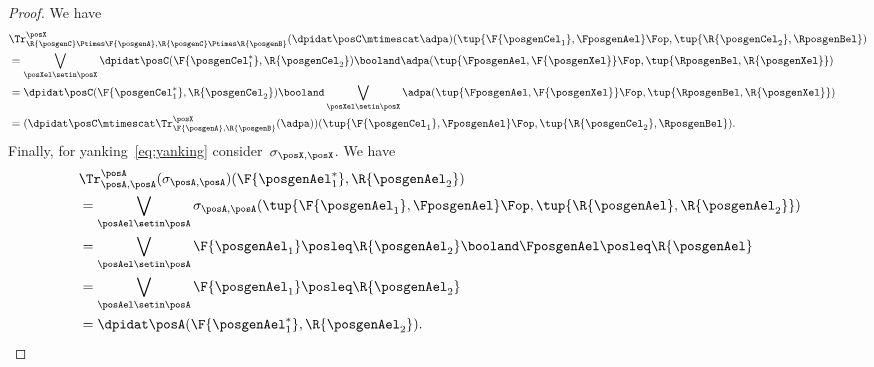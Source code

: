 \begin{proof}
    We have
    \begin{equation}
        \begin{aligned}
            {}
             & \Tr_{\R{\posgenC}\Ptimes \F{\posgenA},\R{\posgenC}\Ptimes \R{\posgenB}}^{\posX}(\dpidat\posC\mtimescat \adpa)(\tup{\F{\posgenCel_1},\FposgenAel}\Fop, \tup{\R{\posgenCel_2},\RposgenBel}) \\
             & = \bigvee_{\posXel \setin \posX} \dpidat\posC(\F{\posgenCel_1^*},\R{\posgenCel_2})\booland \adpa(\tup{\FposgenAel,\F{\posgenXel}}\Fop, \tup{\RposgenBel,\R{\posgenXel}}) \\
             & =\dpidat\posC(\F{\posgenCel_1^*},\R{\posgenCel_2}) \booland \bigvee_{\posXel\setin \posX} \adpa(\tup{\FposgenAel,\F{\posgenXel}}\Fop, \tup{\RposgenBel,\R{\posgenXel}}) \\
             & =(\dpidat\posC \mtimescat \Tr_{\F{\posgenA},\R{\posgenB}}^\posX(\adpa))(\tup{\F{\posgenCel_1},\FposgenAel}\Fop, \tup{\R{\posgenCel_2},\RposgenBel}).
        \end{aligned}
    \end{equation}
    Finally, for yanking~\cref{eq:yanking} consider~$\sigma_{\posX,\posX}$.
    We have
    \begin{equation}
        \begin{aligned}
            ~ & \Tr_{\posA,\posA}^{\posA}(\sigma_{\posA,\posA})(\F{\posgenAel_1^*},\R{\posgenAel_2}) \\
              & = \bigvee_{\posAel\setin \posA} \sigma_{\posA,\posA}(\tup{\F{\posgenAel_1},\FposgenAel}\Fop, \tup{\R{\posgenAel},\R{\posgenAel_2}}) \\
              & =\bigvee_{\posAel\setin \posA} \F{\posgenAel_1} \posleq \R{\posgenAel_2} \booland \FposgenAel\posleq \R{\posgenAel} \\
              & =\bigvee_{\posAel\setin \posA} \F{\posgenAel_1} \posleq \R{\posgenAel_2} \\
              & =\dpidat\posA(\F{\posgenAel_1^*},\R{\posgenAel_2}).
        \end{aligned}
    \end{equation}
\end{proof}


